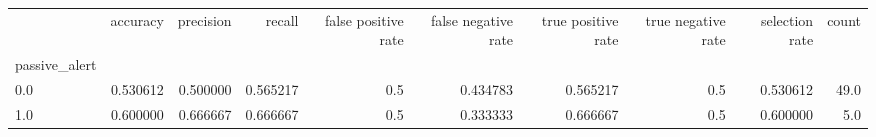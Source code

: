 \begin{tabular}{lrrrrrrrrr}
\toprule
{} &  accuracy &  precision &    recall &  false positive rate &  false negative rate &  true positive rate &  true negative rate &  selection rate &  count \\
passive\_alert &           &            &           &                      &                      &                     &                     &                 &        \\
\midrule
0.0           &  0.530612 &   0.500000 &  0.565217 &                  0.5 &             0.434783 &            0.565217 &                 0.5 &        0.530612 &   49.0 \\
1.0           &  0.600000 &   0.666667 &  0.666667 &                  0.5 &             0.333333 &            0.666667 &                 0.5 &        0.600000 &    5.0 \\
\bottomrule
\end{tabular}
